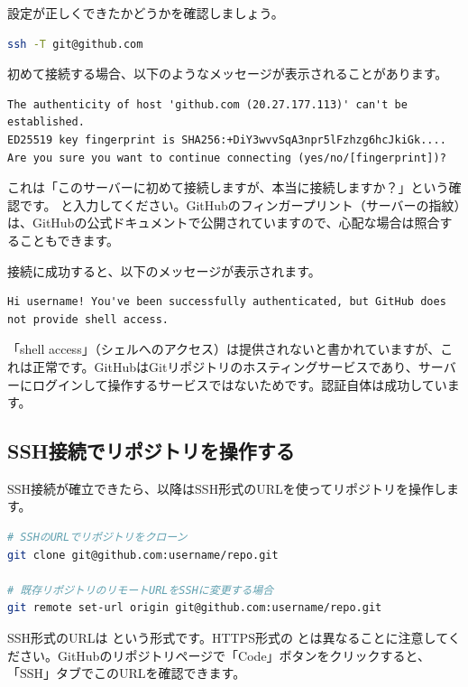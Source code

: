 設定が正しくできたかどうかを確認しましょう。

\begin{lstlisting}[language=bash]
ssh -T git@github.com
\end{lstlisting}

初めて接続する場合、以下のようなメッセージが表示されることがあります。

\begin{lstlisting}[language={}]
The authenticity of host 'github.com (20.27.177.113)' can't be established.
ED25519 key fingerprint is SHA256:+DiY3wvvSqA3npr5lFzhzg6hcJkiGk....
Are you sure you want to continue connecting (yes/no/[fingerprint])?
\end{lstlisting}

これは「このサーバーに初めて接続しますが、本当に接続しますか？」という確認です。 と入力してください。GitHubのフィンガープリント（サーバーの指紋）は、GitHubの公式ドキュメントで公開されていますので、心配な場合は照合することもできます。

接続に成功すると、以下のメッセージが表示されます。

\begin{lstlisting}[language={}]
Hi username! You've been successfully authenticated, but GitHub does not provide shell access.
\end{lstlisting}

「shell access」（シェルへのアクセス）は提供されないと書かれていますが、これは正常です。GitHubはGitリポジトリのホスティングサービスであり、サーバーにログインして操作するサービスではないためです。認証自体は成功しています。

\subsection{SSH接続でリポジトリを操作する}

SSH接続が確立できたら、以降はSSH形式のURLを使ってリポジトリを操作します。

\begin{lstlisting}[language=bash]
# SSHのURLでリポジトリをクローン
git clone git@github.com:username/repo.git

# 既存リポジトリのリモートURLをSSHに変更する場合
git remote set-url origin git@github.com:username/repo.git
\end{lstlisting}

SSH形式のURLは  という形式です。HTTPS形式の  とは異なることに注意してください。GitHubのリポジトリページで「Code」ボタンをクリックすると、「SSH」タブでこのURLを確認できます。

